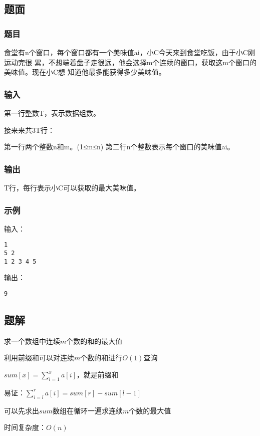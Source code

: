 \subsection{题面}

\subsubsection{题目}
食堂有n个窗口，每个窗口都有一个美味值ai，小C今天来到食堂吃饭，由于小C刚运动完很
累，不想端着盘子走很远，他会选择m个连续的窗口，获取这m个窗口的美味值。现在小C想
知道他最多能获得多少美味值。

\subsubsection{输入}
第一行整数T，表示数据组数。

接来来共3T行：

第一行两个整数n和m。(1≤m≤n)
第二行n个整数表示每个窗口的美味值ai。

\subsubsection{输出}
T行，每行表示小C可以获取的最大美味值。

\subsubsection{示例}
输入：
\begin{lstlisting}
1
5 2
1 2 3 4 5
\end{lstlisting}

输出：
\begin{lstlisting}
9
\end{lstlisting}

\subsection{题解}
求一个数组中连续$m$个数的和的最大值

利用前缀和可以对连续$m$个数的和进行$O(1)$查询

$sum[x] = \sum\limits_{i = 1}^{x}{a[i]}$，就是前缀和

易证：$\sum_{i = l}^{r}{a[i]} = sum[r] - sum[l - 1]$

可以先求出$sum$数组在循环一遍求连续$m$个数的最大值

时间复杂度：$O(n)$

